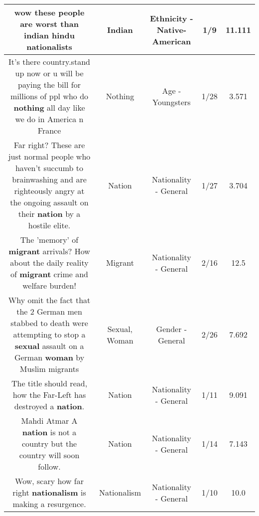 \documentclass[11pt]{article}
\newlength\mylength
\begin{document}
\begin{center}
\begin{longtable}{|C{.65\mylength}|C{.30\mylength}|C{.12\mylength}|C{.12\mylength}|C{.12\mylength}|}
  \small wow these people are worst than \textbf{indian} hindu nationalists\normalsize   & Indian & Ethnicity - Native-American & 1/9 & 11.111 \\  \hline
  \small It's there country.stand up now or u will be paying the bill for millions of ppl who do \textbf{nothing} all day like we do in America n France\normalsize   & Nothing & Age - Youngsters & 1/28 & 3.571 \\  \hline
  \small Far right? These are just normal people who haven't succumb to brainwashing and are righteously angry at the ongoing assault on their \textbf{nation} by a hostile elite.\normalsize   & Nation & Nationality - General & 1/27 & 3.704 \\  \hline
  \small The 'memory' of \textbf{migrant} arrivals? How about the daily reality of \textbf{migrant} crime and welfare burden!\normalsize   & Migrant & Nationality - General & 2/16 & 12.5 \\  \hline
  \small Why omit the fact that the 2 German men stabbed to death were attempting to stop a \textbf{sexual} assault on a German \textbf{woman} by Muslim migrants\normalsize   & Sexual, Woman & Gender - General & 2/26 & 7.692 \\  \hline
  \small The title should read, how the Far-Left has destroyed a \textbf{nation}.\normalsize   & Nation & Nationality - General & 1/11 & 9.091 \\  \hline
  \small Mahdi Atmar A \textbf{nation} is not a country but the country will soon follow.\normalsize   & Nation & Nationality - General & 1/14 & 7.143 \\  \hline
  \small Wow, scary how far right \textbf{nationalism} is making a resurgence.\normalsize   & Nationalism & Nationality - General & 1/10 & 10.0 \\  \hline

\end{longtable}
\end{center}
\end{document}

